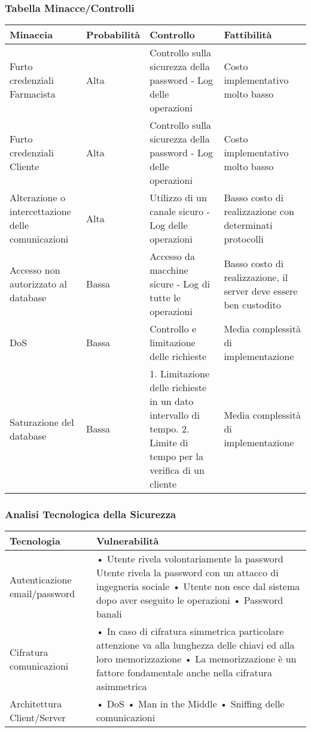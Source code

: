 \subsubsection{Tabella Minacce/Controlli}

\begin{tabular} {|P{3.5cm}|P{2.5cm}|P{6cm}|P{5cm}|}
\hline
  \textbf{Minaccia} & \textbf{Probabilità} & \textbf{Controllo} & \textbf{Fattibilità}\\
\hline
  Furto credenziali Farmacista & Alta & Controllo sulla sicurezza della password - Log delle operazioni & Costo implementativo molto basso\\
\hline
  Furto credenziali Cliente & Alta & Controllo sulla sicurezza della password - Log delle operazioni & Costo implementativo molto basso\\
\hline
  Alterazione o intercettazione delle comunicazioni & Alta & Utilizzo di un canale sicuro - Log delle operazioni & Basso costo di realizzazione con determinati protocolli\\
\hline
  Accesso non autorizzato al database & Bassa & Accesso da macchine sicure - Log di tutte le operazioni & Basso costo di realizzazione, il server deve essere ben custodito\\
\hline
  DoS & Bassa & Controllo e limitazione delle richieste & Media complessità di implementazione\\
\hline
  Saturazione del database & Bassa & 1. Limitazione delle richieste in un dato intervallo di tempo. 2. Limite di tempo per la verifica di un cliente & Media complessità di implementazione\\
\hline
\end{tabular}

\subsubsection{Analisi Tecnologica della Sicurezza}

\begin{tabular} {|P{4cm}|P{13cm}|}
\hline
  Tecnologia & Vulnerabilità\\
\hline
  Autenticazione email/password & • Utente rivela volontariamente la password Utente rivela la password con un attacco di ingegneria sociale \linebreak • Utente non esce dal sistema dopo aver eseguito le operazioni \linebreak • Password banali\\
\hline
  Cifratura comunicazioni & • In caso di cifratura simmetrica particolare attenzione va alla lunghezza delle chiavi ed alla loro memorizzazione \linebreak • La memorizzazione è un fattore fondamentale anche nella cifratura asimmetrica\\
\hline
  Architettura Client/Server & • DoS \linebreak • Man in the Middle \linebreak • Sniffing delle comunicazioni\\
\hline
\end{tabular}

